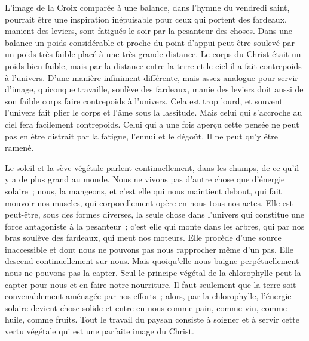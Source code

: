 \documentclass[french,twoside]{book} %
\begin{document}
L'image de la Croix comparée à une balance, dans l'hymne du vendredi saint, pourrait être une inspiration inépuisable pour ceux qui portent des fardeaux, manient des leviers, sont fatigués le soir par la pesanteur des choses. Dans une balance un poids considérable et proche du point d'appui peut être soulevé par un poids très faible placé à une très grande distance. Le corps du Christ était un poids bien faible, mais par la distance entre la terre et le ciel il a fait contrepoids à l'univers. D'une manière infiniment différente, mais assez analogue pour servir d'image, quiconque travaille, soulève des fardeaux, manie des leviers doit aussi de son faible corps faire contrepoids à l'univers. Cela est trop lourd, et souvent l'univers fait plier le corps et l'âme sous la lassitude. Mais celui qui s'accroche au ciel fera facilement contrepoids. Celui qui a une fois aperçu cette pensée ne peut pas en être distrait par la fatigue, l'ennui et le dégoût. Il ne peut qu'y être ramené.\par
Le soleil et la sève végétale parlent continuellement, dans les champs, de ce qu'il y a de plus grand au monde. Nous ne vivons pas d'autre chose que d'énergie solaire ; nous, la mangeons, et c'est elle qui nous maintient debout, qui fait mouvoir nos muscles, qui corporellement opère en nous tous nos actes. Elle est peut-être, sous des formes diverses, la seule chose dans l'univers qui constitue une force antagoniste à la pesanteur ; c'est elle qui monte dans les arbres, qui par nos bras soulève des fardeaux, qui meut nos moteurs. Elle procède d'une source inaccessible et dont nous ne pouvons pas nous rapprocher même d'un pas. Elle descend continuellement sur nous. Mais quoiqu'elle nous baigne perpétuellement nous ne pouvons pas la capter. Seul le principe végétal de la chlorophylle peut la capter pour nous et en faire notre nourriture. Il faut seulement que la terre soit convenablement aménagée par nos efforts ; alors, par la chlorophylle, l'énergie solaire devient chose solide et entre en nous comme pain, comme vin, comme huile, comme fruits. Tout le travail du paysan consiste à soigner et à servir cette vertu végétale qui est une parfaite image du Christ.\par
\end{document}
